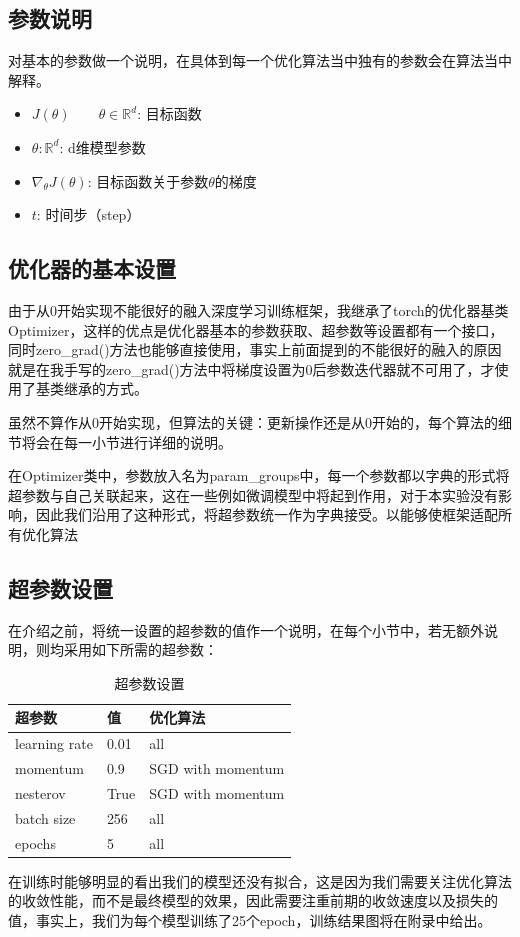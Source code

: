 \documentclass[10.5pt,a4paper]{article}%
\begin{document}
        \subsection{参数说明}
        对基本的参数做一个说明，在具体到每一个优化算法当中独有的参数会在算法当中解释。
        \begin{itemize}
            \item $J(\theta)\qquad \theta\in\mathbb{R}^d$: 目标函数
            \item $\theta: \mathbb{R}^d$: d维模型参数
            \item $\nabla_\theta J(\theta)$: 目标函数关于参数$\theta$的梯度
            \item $t$: 时间步（step）
        \end{itemize}
        \subsection{优化器的基本设置}
        由于从0开始实现不能很好的融入深度学习训练框架，我继承了torch的优化器基类Optimizer，这样的优点是优化器基本的参数获取、超参数等设置都有一个接口，同时zero\_grad()方法也能够直接使用，事实上前面提到的不能很好的融入的原因就是在我手写的zero\_grad()方法中将梯度设置为0后参数迭代器就不可用了，才使用了基类继承的方式。\par
        虽然不算作从0开始实现，但算法的关键：更新操作还是从0开始的，每个算法的细节将会在每一小节进行详细的说明。\par
        在Optimizer类中，参数放入名为param\_groups中，每一个参数都以字典的形式将超参数与自己关联起来，这在一些例如微调模型中将起到作用，对于本实验没有影响，因此我们沿用了这种形式，将超参数统一作为字典接受。以能够使框架适配所有优化算法\par
        \subsection{超参数设置}
        在介绍之前，将统一设置的超参数的值作一个说明，在每个小节中，若无额外说明，则均采用如下所需的超参数：
        \begin{table}[!ht]
        \centering
        \begin{tabular}{|l|l|l|}
        \hline
            超参数 & 值 & 优化算法\\ \hline
            learning rate & 0.01 & all\\ \hline
            momentum & 0.9 & SGD with momentum\\ \hline
            nesterov & True & SGD with momentum\\ \hline
            batch size & 256 & all \\ \hline
            epochs & 5 & all\\ \hline
        \end{tabular}
        \caption{超参数设置}
         \end{table}\par
         在训练时能够明显的看出我们的模型还没有拟合，这是因为我们需要关注优化算法的收敛性能，而不是最终模型的效果，因此需要注重前期的收敛速度以及损失的值，事实上，我们为每个模型训练了25个epoch，训练结果图将在附录中给出。
\end{document}
